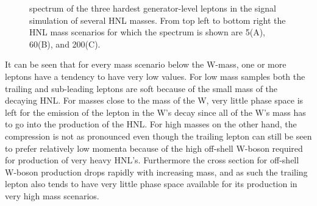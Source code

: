 \begin{figure}[h]
\noindent
{}
\caption{\pt spectrum of the three hardest generator-level leptons in
  the signal simulation of several HNL masses. From top left to bottom
  right the HNL mass scenarios for which the spectrum is shown are 5\GeV (A), 60\GeV (B), and 200\GeV (C).}
\label{fig:genPt}
\end{figure}

It can be seen that for every mass scenario below the W-mass, one or
more leptons have a tendency to have very low \pt values. For low mass
samples both the trailing and sub-leading leptons are soft because of
the small mass of the decaying HNL. For masses close to the mass of
the W, very little phase space is left for the emission of the lepton
in the W's decay since all of the W's mass has to go into the
production of the HNL. For high masses on the other hand, the
compression is not as pronounced even though the trailing lepton can
still be seen to prefer relatively low momenta because of the high off-shell W-boson required for production of very heavy
HNL's. Furthermore the cross section for off-shell W-boson production drops
rapidly with increasing mass, and as such the trailing lepton also
tends to have very little phase space available for its production in
very high mass scenarios.

